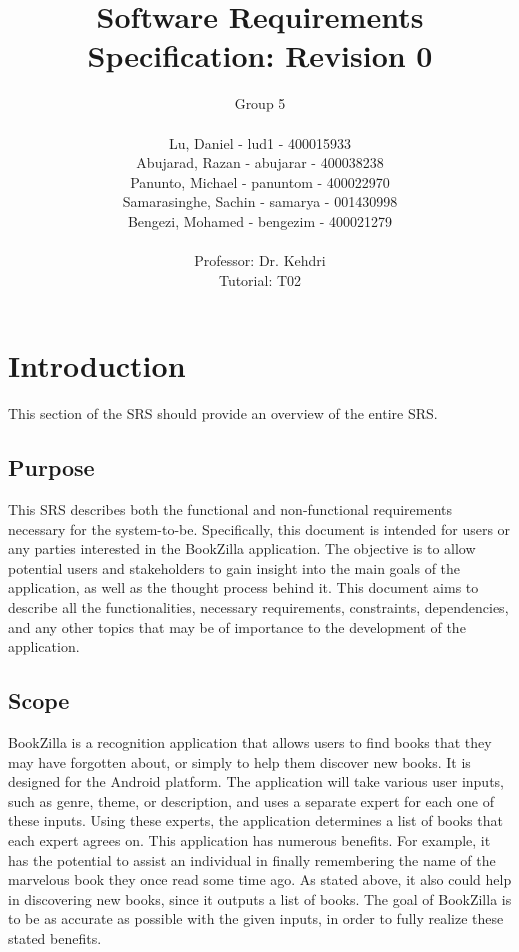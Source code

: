 \documentclass[12pt]{article}
\title{Software Requirements Specification: Revision 0}
\author{Group 5 \\
            \\ Lu, Daniel - lud1  - 400015933
            \\ Abujarad, Razan - abujarar  - 400038238
            \\ Panunto, Michael - panuntom - 400022970
            \\ Samarasinghe, Sachin - samarya - 001430998
            \\ Bengezi, Mohamed - bengezim - 400021279 \\
            \\ Professor: Dr. Kehdri
            \\ Tutorial: T02}
\begin{document}
    
    \setlength{\arrayrulewidth}{1.5pt}
    
    \maketitle
    
    \newpage
    
    {\centering
      \tableofcontents\par
    }
    \newpage
    
    \section{Introduction}
    \label{sec:introduction}
    
    This section of the SRS should provide an overview of the entire SRS.
    
    \subsection{Purpose}
    \label{sub:purpose}
    \tab This SRS describes both the functional and non-functional requirements necessary for the system-to-be. Specifically, this document is intended for users or any parties interested in the BookZilla application. The objective is to allow potential users and stakeholders to gain insight into the main goals of the application, as well as the thought process behind it. This document aims to describe all the functionalities, necessary requirements, constraints, dependencies, and any other topics that may be of importance to the development of the application.
    
    \subsection{Scope}
    \label{sub:scope}
    \tab BookZilla is a recognition application that allows users to find books that they may have forgotten about, or simply to help them discover new books. It is designed for the Android platform. The application will take various user inputs, such as genre, theme, or description, and uses a separate expert for each one of these inputs. Using these experts, the application determines a list of books that each expert agrees on. This application has numerous benefits. For example, it has the potential to assist an individual in finally remembering the name of the marvelous book they once read some time ago. As stated above, it also could help in discovering new books, since it outputs a list of books. The goal of BookZilla is to be as accurate as possible with the given inputs, in order to fully realize these stated benefits.
    
\end{document}
